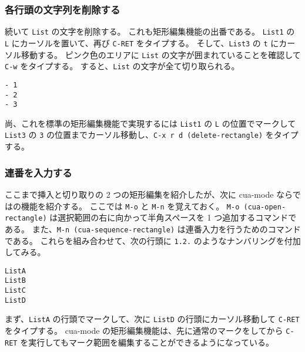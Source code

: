 \subsubsection{各行頭の文字列を削除する}
続いて \texttt{List} の文字を削除する。
これも矩形編集機能の出番である。
\texttt{List1} の \texttt{L} にカーソルを置いて、再び \texttt{C-RET} をタイプする。
そして、\texttt{List3} の \texttt{t} にカーソル移動する。
ピンク色のエリアに \texttt{List} の文字が囲まれていることを確認して \texttt{C-w} をタイプする。
すると、\texttt{List} の文字が全て切り取られる。
\begin{mdframed}[roundcorner=0.50zw,leftmargin=3.00zw,rightmargin=3.00zw,skipabove=0.40zw,skipbelow=0.40zw,innertopmargin=4.00pt,innerbottommargin=4.00pt,innerleftmargin=5.00pt,innerrightmargin=5.00pt,linecolor=gray!020,linewidth=0.50pt,backgroundcolor=gray!20]
\begin{verbatim}
- 1
- 2
- 3
\end{verbatim}
\end{mdframed}
尚、これを標準の矩形編集機能で実現するには \texttt{List1} の \texttt{L} の位置でマークして \texttt{List3} の \texttt{3} の位置までカーソル移動し、\texttt{C-x r d (delete-rectangle)} をタイプする。
\subsubsection{連番を入力する}
ここまで挿入と切り取りの 2 つの矩形編集を紹介したが、次に cua-mode ならではの機能を紹介する。
ここでは \texttt{M-o} と \texttt{M-n} を覚えておく。
\texttt{M-o (cua-open-rectangle)} は選択範囲の右に向かって半角スペースを 1 つ追加するコマンドである。
また、\texttt{M-n (cua-sequence-rectangle)} は連番入力を行うためのコマンドである。
これらを組み合わせて、次の行頭に \texttt{1.\hspc{2.00pt}2.} のようなナンバリングを付加してみる。
\begin{mdframed}[roundcorner=0.50zw,leftmargin=3.00zw,rightmargin=3.00zw,skipabove=0.40zw,skipbelow=0.40zw,innertopmargin=4.00pt,innerbottommargin=4.00pt,innerleftmargin=5.00pt,innerrightmargin=5.00pt,linecolor=gray!020,linewidth=0.50pt,backgroundcolor=gray!20]
\begin{verbatim}
ListA
ListB
ListC
ListD
\end{verbatim}
\end{mdframed}
まず、\texttt{ListA} の行頭でマークして、次に \texttt{ListD} の行頭にカーソル移動して \texttt{C-RET} をタイプする。
cua-mode の矩形編集機能は、先に通常のマークをしてから \texttt{C-RET} を実行してもマーク範囲を編集することができるようになっている。\\

